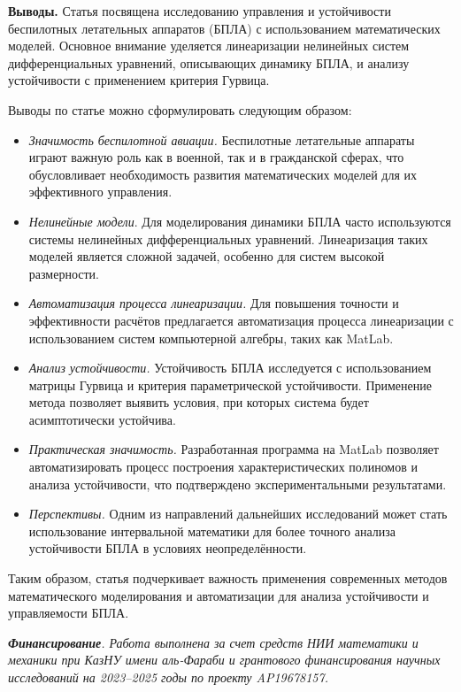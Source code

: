 {\bfseries Выводы.} Статья посвящена исследованию управления и устойчивости
беспилотных летательных аппаратов (БПЛА) с использованием математических
моделей. Основное внимание уделяется линеаризации нелинейных систем
дифференциальных уравнений, описывающих динамику БПЛА, и анализу
устойчивости с применением критерия Гурвица.

Выводы по статье можно сформулировать следующим образом:

\begin{itemize}
\item
  \emph{Значимость беспилотной авиации.} Беспилотные летательные
  аппараты играют важную роль как в военной, так и в гражданской сферах,
  что обусловливает необходимость развития математических моделей для их
  эффективного управления.
\item
  \emph{Нелинейные модели}. Для моделирования динамики БПЛА часто
  используются системы нелинейных дифференциальных уравнений.
  Линеаризация таких моделей является сложной задачей, особенно для
  систем высокой размерности.
\item
  \emph{Автоматизация процесса линеаризации.} Для повышения точности и
  эффективности расчётов предлагается автоматизация процесса
  линеаризации с использованием систем компьютерной алгебры, таких как
  MatLab.
\item
  \emph{Анализ устойчивости.} Устойчивость БПЛА исследуется с
  использованием матрицы Гурвица и критерия параметрической
  устойчивости. Применение метода позволяет выявить условия, при которых
  система будет асимптотически устойчива.
\item
  \emph{Практическая значимость.} Разработанная программа на MatLab
  позволяет автоматизировать процесс построения характеристических
  полиномов и анализа устойчивости, что подтверждено экспериментальными
  результатами.
\item
  \emph{Перспективы.} Одним из направлений дальнейших исследований может
  стать использование интервальной математики для более точного анализа
  устойчивости БПЛА в условиях неопределённости.
\end{itemize}

Таким образом, статья подчеркивает важность применения современных
методов математического моделирования и автоматизации для анализа
устойчивости и управляемости БПЛА.

\emph{{\bfseries Финансирование}. Работа выполнена за счет средств НИИ
математики и механики при КазНУ имени аль-Фараби и грантового
финансирования научных исследований на 2023--2025 годы по проекту
AP19678157.}

